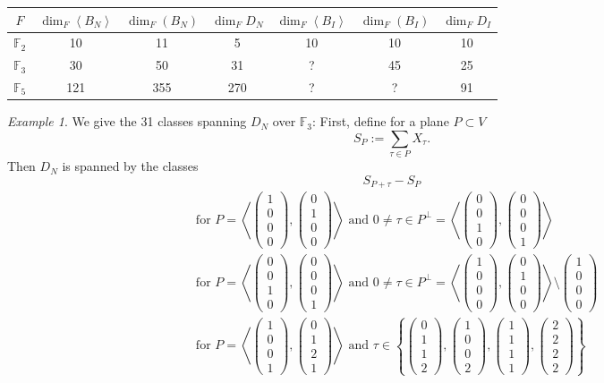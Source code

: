 \documentclass{amsart}
\newcommand{\vect}[1]{\left( \begin{smallmatrix} #1 \end{smallmatrix} \right)}
\newcommand{\plan}[2]{\left< \vect{ #1 }, \vect{ #2 } \right>}
\theoremstyle{plain}
\theoremstyle{definition}
\theoremstyle{remark}
\newtheorem{example}[theorem]{Example}
\begin{document}
\begin{tabular}{c||c|c|c||c|c|c}
 $F$ & $\dim_F \left<B_N\right>$ & $\dim_F(B_N)$ & $\dim_F D_N$ & $\dim_F \left<B_I\right>$ & $\dim_F(B_I)$ & $\dim_F D_I $\\
\hline
$\mathbb F_2$ & 10 & 11 &  5 & 10 & 10 & 10 \\
$\mathbb F_3$ & 30 & 50 & 31 & ? & 45 & 25 \\
$\mathbb F_5$ &121 &355 &270 & ? & ? & 91 
\end{tabular}
\begin{example}
We give the 31 classes spanning $D_N$ over $\mathbb F_3$: 
First, define for a plane $P\subset V$
$$
S_P := \sum_{\tau \in P} X_\tau.
$$
Then $D_N$ is spanned by the classes 
$$S_{P+\tau} - S_P $$
\begin{align}
&\text{for } P=\plan{1\\0\\0\\0}{0\\1\\0\\0} \text{ and } 0\neq \tau\in P^\perp = \plan{0\\0\\1\\0}{0\\0\\0\\1} 
\\
&\text{for } P=\plan{0\\0\\1\\0}{0\\0\\0\\1}  \text{ and } 0\neq \tau \in P^\perp = \plan{1\\0\\0\\0}{0\\1\\0\\0} \setminus \vect{1\\0\\0\\0}
\\
&\text{for } P=\plan{1\\0\\0\\1}{0\\1\\2\\1} \text{ and } \tau \in \left\{ \vect{0\\1\\1\\2},\vect{1\\0\\0\\2},\vect{1\\1\\1\\1},\vect{2\\2\\2\\2} \right\}

\end{align}
\end{example}
\end{document}
